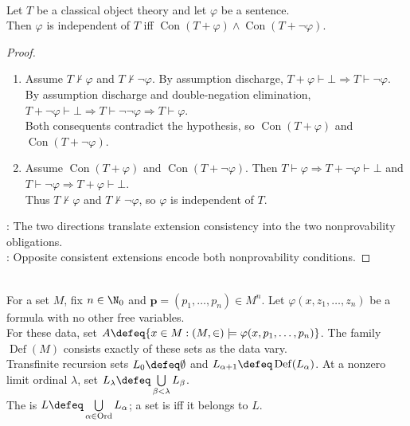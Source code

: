 \begin{proposition} \label{prop:independence-via-consistent-extensions} \\
Let $T$ be a classical object theory and let $\varphi$ be a sentence.\\
Then $\varphi$ is independent of $T$ iff $\operatorname{Con}(T+\varphi)\land\operatorname{Con}(T+\neg\varphi)$.
\begin{proof}
\begin{enumerate}[label=\roman*.]
\setlength{\itemsep}{0pt}
\item[$(\Rightarrow)$] Assume $T\nvdash\varphi$ and $T\nvdash\neg\varphi$. By assumption discharge, $T+\varphi\vdash\bot\Longrightarrow T\vdash\neg\varphi$.\\
By assumption discharge and double-negation elimination, $T+\neg\varphi\vdash\bot\Longrightarrow T\vdash\neg\neg\varphi\Longrightarrow T\vdash\varphi$.\\
Both consequents contradict the hypothesis, so $\operatorname{Con}(T+\varphi)$ and $\operatorname{Con}(T+\neg\varphi)$.
\item[$(\Leftarrow)$] Assume $\operatorname{Con}(T+\varphi)$ and $\operatorname{Con}(T+\neg\varphi)$. Then $T\vdash\varphi\Longrightarrow T+\neg\varphi\vdash\bot$ and $T\vdash\neg\varphi\Longrightarrow T+\varphi\vdash\bot$.\\
Thus $T\nvdash\varphi$ and $T\nvdash\neg\varphi$, so $\varphi$ is independent of $T$.
\end{enumerate}
: The two directions translate extension consistency into the two nonprovability obligations.\\
: Opposite consistent extensions encode both nonprovability conditions.
\end{proof}
\end{proposition}

\begin{definition} \label{def:constructible-hierarchy} \\
For a set $M$, fix $n\in\N_0$ and $\mathbf{p}=(p_1,\ldots,p_n)\in M^n$. Let $\varphi(x,z_1,\ldots,z_n)$ be a formula with no other free variables.\\
For these data, set $A\defeq\{x\in M:(M,\in)\models\varphi(x,p_1,\ldots,p_n)\}$. The family $\operatorname{Def}(M)$ consists exactly of these sets as the data vary.\\
Transfinite recursion sets $L_0\defeq\emptyset$ and $L_{\alpha+1}\defeq\operatorname{Def}(L_\alpha)$. At a nonzero limit ordinal $\lambda$, set $L_\lambda\defeq\bigcup\limits_{\beta<\lambda}L_\beta$.\\
The  is $L\defeq\bigcup\limits_{\alpha\in\mathrm{Ord}}L_\alpha$; a set is  iff it belongs to $L$.
\end{definition}

